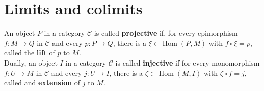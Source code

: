 \begin{example}
\begin{enumerate}
    \end{enumerate}
\end{example}






\section{Limits and colimits}

An object $P$ in a category $\mathcal{C}$ is called \textbf{projective} if, for every epimorphism $f: M \rightarrow Q$ in $\mathcal{C}$ and every $p: P \rightarrow Q$, there is a $\xi \in \operatorname{Hom}(P, M)$ with $f \circ \xi=p$, called the \textbf{lift} of $p$ to $M$.\\
Dually, an object $I$ in a category $\mathcal{C}$ is called \textbf{injective} if for every monomorphism $f: U \rightarrow M$ in $\mathcal{C}$ and every $j: U \rightarrow I$, there is a $\zeta \in \operatorname{Hom}(M, I)$ with $\zeta \circ f=j$, called and \textbf{extension} of $j$ to $M$.
\begin{center}
      \hspace{4cm}
\end{center}





